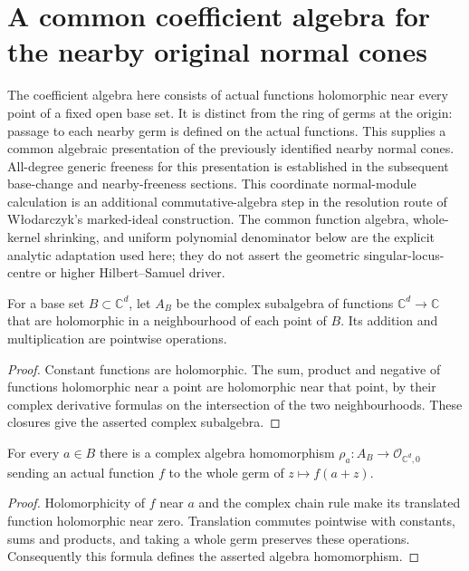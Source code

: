 \section{A common coefficient algebra for the nearby original normal cones}

The coefficient algebra here consists of actual functions holomorphic near every
point of a fixed open base set. It is distinct from the ring of germs at the
origin: passage to each nearby germ is defined on the actual functions. This
supplies a common algebraic presentation of the previously identified nearby
normal cones. All-degree generic freeness for this presentation is established in the
subsequent base-change and nearby-freeness sections.
This coordinate normal-module calculation is an additional commutative-algebra
step in the resolution route of W\l odarczyk's marked-ideal construction.
The common function algebra, whole-kernel shrinking, and uniform polynomial
denominator below are the explicit analytic adaptation used here; they do not
assert the geometric singular-locus-centre or higher Hilbert--Samuel driver.


\begin{definition}
\label{hir:relative-normal-coefficient-function-algebra}
\leanok
For a base set $B\subset\mathbb C^d$, let $A_B$ be the complex subalgebra of
functions $\mathbb C^d\to\mathbb C$ that are holomorphic in a neighbourhood of
each point of $B$. Its addition and multiplication are pointwise operations.
\end{definition}
\begin{proof}
Constant functions are holomorphic. The sum, product and negative of functions
holomorphic near a point are holomorphic near that point, by their complex
derivative formulas on the intersection of the two neighbourhoods. These
closures give the asserted complex subalgebra.
\end{proof}

\begin{lemma}
\label{hir:relative-normal-coefficient-function-germ-hom}
\leanok
{}
For every $a\in B$ there is a complex algebra homomorphism
$\rho_a:A_B\to\mathcal O_{\mathbb C^d,0}$ sending an actual function $f$ to
the whole germ of $z\mapsto f(a+z)$.
\end{lemma}
\begin{proof}
Holomorphicity of $f$ near $a$ and the complex chain rule make its translated
function holomorphic near zero. Translation commutes pointwise with constants,
sums and products, and taking a whole germ preserves these operations.
Consequently this formula defines the asserted algebra homomorphism.
\end{proof}

